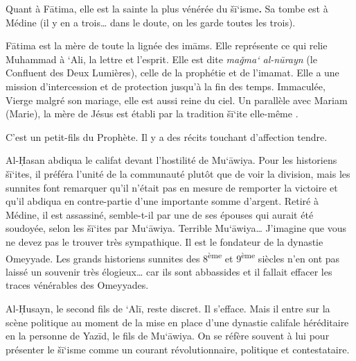 Quant à Fātima, elle est la sainte la plus vénérée du šī`isme\textbf{.}
Sa tombe est à Médine (il y en a trois\ldots{} dans le doute, on les
garde toutes les trois).

Fātima est la mère de toute la lignée des imāms. Elle représente ce qui
relie Muhammad à `Ali, la lettre et l'esprit. Elle est dite \emph{maǧma`
al-nūrayn} (le Confluent des Deux Lumières), celle de la prophétie et de
l'imamat. Elle a une mission d'intercession et de protection jusqu'à la
fin des temps. Immaculée, Vierge malgré son mariage, elle est aussi
reine du ciel. Un parallèle avec Mariam (Marie), la mère de Jésus est
établi par la tradition šī`ite elle-même .


C'est un petit-fils du Prophète. Il y a des récits touchant d'affection
tendre.

Al-Ḥasan abdiqua le califat devant l'hostilité de Mu`āwiya. Pour les
historiens šī`ites, il préféra l'unité de la communauté plutôt que de
voir la division, mais les sunnites font remarquer qu'il n'était pas en
mesure de remporter la victoire et qu'il abdiqua en contre-partie d'une
importante somme d'argent. Retiré à Médine, il est assassiné,
semble-t-il par une de ses épouses qui aurait été soudoyée, selon les
šī`ites par Mu`āwiya. Terrible Mu`āwiya\ldots{} J'imagine que vous ne
devez pas le trouver très sympathique. Il est le fondateur de la
dynastie Omeyyade. Les grands historiens sunnites des
8\textsuperscript{ème} et 9\textsuperscript{ème} siècles n'en ont pas
laissé un souvenir très élogieux\ldots{} car ils sont abbassides et il
fallait effacer les traces vénérables des Omeyyades.


Al-Ḥusayn, le second fils de `Alī, reste discret. Il s'efface. Mais il
entre sur la scène politique au moment de la mise en place d'une
dynastie califale héréditaire en la personne de Yazīd, le fils de
Mu`āwiya. On se réfère souvent à lui pour présenter le šī`isme comme un
courant révolutionnaire, politique et contestataire.

